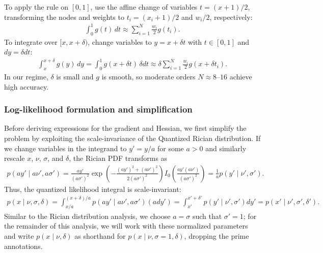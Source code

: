 \documentclass{article}
\begin{document}
To apply the rule on $[0,1]$, use the affine change of variables $t = (x+1)/2$, transforming the nodes and weights to $t_i = (x_i+1)/2$ and $w_i/2$, respectively:
%
\begin{align}
  \int_{0}^{1} g(t) \, dt \approx \sum_{i=1}^{N} \frac{w_i}{2} g(t_i).
\end{align}
%
To integrate over $[x, x + \delta)$, change variables to $y = x + \delta t$ with $t\in[0,1]$ and $dy = \delta dt$:
%
\begin{align}
  \int_{x}^{x + \delta} g(y) \, dy = \int_{0}^{1} g(x + \delta t) \, \delta dt
  \approx \delta \sum_{i=1}^{N} \frac{w_i}{2} g(x + \delta t_i).
\end{align}
%
In our regime, $\delta$ is small and $g$ is smooth, so moderate orders $N \approx 8\text{--}16$ achieve high accuracy.

\subsubsection{Log-likelihood formulation and simplification}

Before deriving expressions for the gradient and Hessian, we first simplify the problem by exploiting the scale-invariance of the Quantized Rician distribution.
If we change variables in the integrand to $y' = y / a$ for some $a > 0$ and similarly rescale $x$, $\nu$, $\sigma$, and $\delta$, the Rician PDF transforms as
%
\begin{align}
  p(a y' \mid a \nu', a \sigma')
  = \frac{a y'}{(a \sigma')^2} \exp\left(-\frac{(a y')^2+(a \nu')^2}{2(a \sigma')^2}\right) I_0\left(\frac{a y' (a \nu')}{(a \sigma')^2}\right)
  = \frac{1}{a} p(y' \mid \nu', \sigma').
\end{align}
%
Thus, the quantized likelihood integral is scale-invariant:
%
\begin{align}
  p(x \mid \nu, \sigma, \delta)
  = \int_{x/a}^{(x + \delta)/a} p(a y' \mid a\nu', a\sigma') (a dy') = \int_{x'}^{x'+\delta'} p(y' \mid \nu', \sigma') dy'
  = p(x' \mid \nu', \sigma', \delta').
\end{align}
%
Similar to the Rician distribution analysis, we choose $a = \sigma$ such that $\sigma'=1$;
for the remainder of this analysis, we will work with these normalized parameters and write $p(x \mid \nu, \delta)$ as shorthand for $p(x \mid \nu, \sigma=1, \delta)$, dropping the prime annotations.
\end{document}
